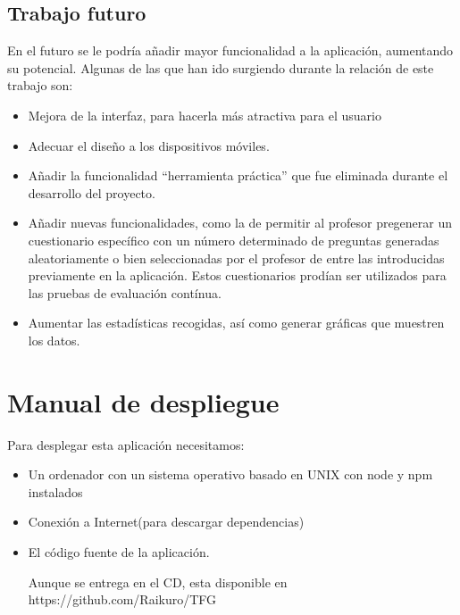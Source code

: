 \documentclass[openright,twoside,10pt]{book}
\providecommand{\tightlist}{%
  \setlength{\itemsep}{0pt}\setlength{\parskip}{0pt}}
\begin{document}
    \section{Trabajo futuro}\label{trabajo-futuro}
    
    En el futuro se le podría añadir mayor funcionalidad a la aplicación,
    aumentando su potencial. Algunas de las que han ido surgiendo durante la
    relación de este trabajo son:
    
    \begin{itemize}
    \tightlist
    \item
      Mejora de la interfaz, para hacerla más atractiva para el usuario
    \item
      Adecuar el diseño a los dispositivos móviles.
    \item
      Añadir la funcionalidad \enquote{herramienta práctica} que fue
      eliminada durante el desarrollo del proyecto.
    \item
      Añadir nuevas funcionalidades, como la de permitir al profesor
      pregenerar un cuestionario específico con un número determinado de
      preguntas generadas aleatoriamente o bien seleccionadas por el
      profesor de entre las introducidas previamente en la aplicación. Estos
      cuestionarios prodían ser utilizados para las pruebas de evaluación
      contínua.
    \item
      Aumentar las estadísticas recogidas, así como generar gráficas que
      muestren los datos.
    \end{itemize}
    
    \appendix
    
    \chapter{ Manual de despliegue }
    
    Para desplegar esta aplicación necesitamos:
    
    \begin{itemize}
    \item
      Un ordenador con un sistema operativo basado en UNIX con node y npm
      instalados
    \item
      Conexión a Internet(para descargar dependencias)
    \item
      El código fuente de la aplicación.
    
      Aunque se entrega en el CD, esta disponible en
      https://github.com/Raikuro/TFG
    \end{itemize}
    
\end{document}
